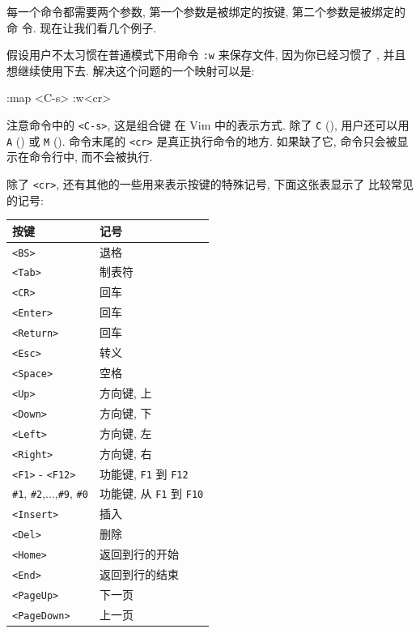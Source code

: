 每一个命令都需要两个参数, 第一个参数是被绑定的按键, 第二个参数是被绑定的命
令. 现在让我们看几个例子.

假设用户不太习惯在普通模式下用命令 \texttt{:w} 来保存文件, 因为你已经习惯了
, 并且想继续使用下去.
解决这个问题的一个映射可以是:
\begin{vimcmd}
:map <C-s> :w<cr>
\end{vimcmd}

注意命令中的 \texttt{<C-s>}, 这是组合键  在 Vim 中的表示方式.
除了 \texttt{C} (), 用户还可以用 \texttt{A} () 或
\texttt{M} (). 命令末尾的 \texttt{<cr>} 是真正执行命令的地方.
如果缺了它, 命令只会被显示在命令行中, 而不会被执行.

除了 \texttt{<cr>}, 还有其他的一些用来表示按键的特殊记号, 下面这张表显示了
比较常见的记号:
\begin{center}
    \begin{tabular}{ll}
        \hline
        按键        & 记号  \\
        \hline
        \texttt{<BS>}   & 退格 \\
        \texttt{<Tab>}   &  制表符 \\
        \texttt{<CR>}   & 回车  \\
        \texttt{<Enter>}   & 回车 \\
        \texttt{<Return>}   & 回车 \\
        \texttt{<Esc>}   & 转义 \\
        \texttt{<Space>}   & 空格 \\
        \texttt{<Up>}   & 方向键, 上 \\
        \texttt{<Down>}   & 方向键, 下 \\
        \texttt{<Left>}   & 方向键, 左 \\
        \texttt{<Right>}   & 方向键, 右 \\
        \texttt{<F1>} - \texttt{<F12>}  & 功能键, \texttt{F1} 到
            \texttt{F12} \\
        \texttt{\#1}, \texttt{\#2},...,\texttt{\#9}, \texttt{\#0}  & 功能键, 从
            \texttt{F1} 到 \texttt{F10} \\
        \texttt{<Insert>}   & 插入 \\
        \texttt{<Del>}   & 删除 \\
        \texttt{<Home>}   & 返回到行的开始 \\
        \texttt{<End>}   & 返回到行的结束 \\
        \texttt{<PageUp>}   & 下一页 \\
        \texttt{<PageDown>}   & 上一页 \\
        \hline
    \end{tabular}
\end{center}

